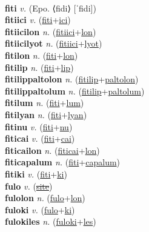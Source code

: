  \label{fikkwelwel} \\
\textbf{fiti} \textit{v.} (Epo. ⟨fidi⟩ [ˈfidi])
 \label{fiti} \\
\textbf{fitiici} \textit{v.} (\hyperref[fiti]{fiti}+\hyperref[ici]{ici})
 \label{fitiici} \\
\textbf{fitiicilon} \textit{n.} (\hyperref[fitiici]{fitiici}+\hyperref[lon]{lon})
 \label{fitiicilon} \\
\textbf{fitiicilyot} \textit{n.} (\hyperref[fitiici]{fitiici}+\hyperref[lyot]{lyot})
 \label{fitiicilyot} \\
\textbf{fitilon} \textit{n.} (\hyperref[fiti]{fiti}+\hyperref[lon]{lon})
 \label{fitilon} \\
\textbf{fitilip} \textit{n.} (\hyperref[fiti]{fiti}+\hyperref[lip]{lip})
 \label{fitilip} \\
\textbf{fitilippaltolon} \textit{n.} (\hyperref[fitilip]{fitilip}+\hyperref[paltolon]{paltolon})
 \label{fitilippaltolon} \\
\textbf{fitilippaltolum} \textit{n.} (\hyperref[fitilip]{fitilip}+\hyperref[paltolum]{paltolum})
 \label{fitilippaltolum} \\
\textbf{fitilum} \textit{n.} (\hyperref[fiti]{fiti}+\hyperref[lum]{lum})
 \label{fitilum} \\
\textbf{fitilyan} \textit{n.} (\hyperref[fiti]{fiti}+\hyperref[lyan]{lyan})
 \label{fitilyan} \\
\textbf{fitinu} \textit{v.} (\hyperref[fiti]{fiti}+\hyperref[nu]{nu})
 \label{fitinu} \\
\textbf{fiticai} \textit{v.} (\hyperref[fiti]{fiti}+\hyperref[cai]{cai})
 \label{fiticai} \\
\textbf{fiticailon} \textit{n.} (\hyperref[fiticai]{fiticai}+\hyperref[lon]{lon})
 \label{fiticailon} \\
\textbf{fiticapalum} \textit{n.} (\hyperref[fiti]{fiti}+\hyperref[capalum]{capalum})
 \label{fiticapalum} \\
\textbf{fitiki} \textit{v.} (\hyperref[fiti]{fiti}+\hyperref[ki]{ki})
 \label{fitiki} \\
\textbf{fulo} \textit{v.} (\hyperref[site]{\sout{site}})
 \label{fulo} \\
\textbf{fulolon} \textit{n.} (\hyperref[fulo]{fulo}+\hyperref[lon]{lon})
 \label{fulolon} \\
\textbf{fuloki} \textit{v.} (\hyperref[fulo]{fulo}+\hyperref[ki]{ki})
 \label{fuloki} \\
\textbf{fulokiles} \textit{n.} (\hyperref[fuloki]{fuloki}+\hyperref[les]{les})
